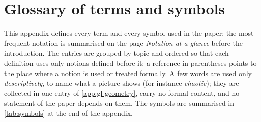 \section{Glossary of terms and symbols}\label{app:glossary}

This appendix defines every term and every symbol used in the paper; the
most frequent notation is summarised on the page \emph{Notation at a glance}
before the introduction. The entries are grouped
by topic and ordered so that each definition uses only notions defined
before it; a reference in parentheses points to the place where a notion
is used or treated formally. A few words are used only \emph{descriptively},
to name what a picture shows (for instance \emph{chaotic}); they are
collected in one entry of \cref{app:gl-geometry}, carry no formal content,
and no statement of the paper depends on them. The symbols are summarised in
\cref{tab:symbols} at the end of the appendix.

